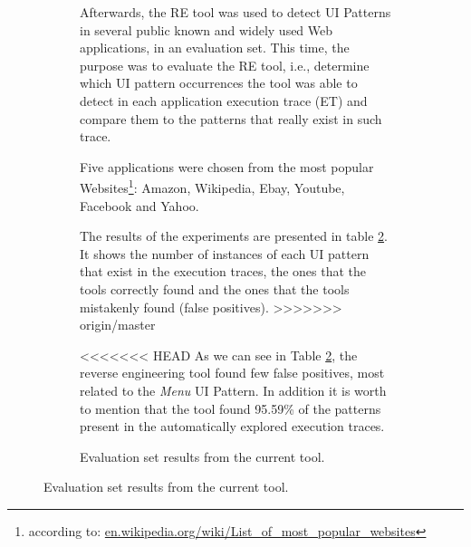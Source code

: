 \documentclass[conference]{IEEEtran}
\begin{document}
\begin{enumerate}
\begin{figure}[!htb]
\begin{itemize}
\begin{figure}[!htb]
\begin{itemize}
Afterwards, the RE tool was used to detect UI Patterns in several public known and widely used Web applications, in an evaluation set. This time, the purpose was to evaluate the RE tool, i.e., determine which UI pattern occurrences the tool was able to detect in each application execution trace (ET) and compare them to the patterns that really exist in such trace.

Five applications were chosen from the most popular Websites\footnote{according to: \url{en.wikipedia.org/wiki/List_of_most_popular_websites‎}}: Amazon, Wikipedia, Ebay, Youtube, Facebook and Yahoo.

The results of the experiments are presented in table \ref{tab:eval_curr}. It shows the number of instances of each UI pattern that exist in the execution traces, the ones that the tools correctly found and the ones that the tools mistakenly found (false positives). 
>>>>>>> origin/master

\begin{table}[!htb]
\caption{Evaluation set results from the current tool.}
\label{tab:eval_curr}
\end{table}

<<<<<<< HEAD
As we can see in Table \ref{tab:eval_curr}, the reverse engineering tool found few false positives, most related to the \textit{Menu} UI Pattern. In addition it is worth to mention that the tool found 95.59\% of the  patterns present in the automatically explored execution traces.


\end{itemize}
\end{figure}
\end{itemize}
\end{figure}
\end{enumerate}
\end{document}
